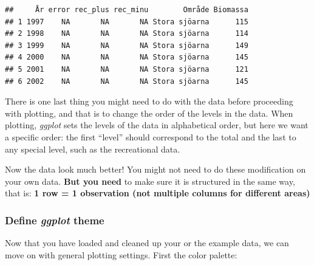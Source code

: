 \documentclass[]{article}
\newenvironment{Shaded}{\begin{snugshade}}{\end{snugshade}}
\newcommand{\KeywordTok}[1]{\textcolor[rgb]{0.13,0.29,0.53}{\textbf{#1}}}
\newcommand{\DataTypeTok}[1]{\textcolor[rgb]{0.13,0.29,0.53}{#1}}
\newcommand{\StringTok}[1]{\textcolor[rgb]{0.31,0.60,0.02}{#1}}
\newcommand{\OperatorTok}[1]{\textcolor[rgb]{0.81,0.36,0.00}{\textbf{#1}}}
\newcommand{\NormalTok}[1]{#1}
\begin{document}
\begin{verbatim}
##     År error rec_plus rec_minu        Område Biomassa
## 1 1997    NA       NA       NA Stora sjöarna      115
## 2 1998    NA       NA       NA Stora sjöarna      114
## 3 1999    NA       NA       NA Stora sjöarna      149
## 4 2000    NA       NA       NA Stora sjöarna      145
## 5 2001    NA       NA       NA Stora sjöarna      121
## 6 2002    NA       NA       NA Stora sjöarna      145
\end{verbatim}

There is one last thing you might need to do with the data before
proceeding with plotting, and that is to change the order of the levels
in the data. When plotting, \emph{ggplot} sets the levels of the data in
alphabetical order, but here we want a specific order: the first
``level'' should correspond to the total and the last to any special
level, such as the recreational data.

\begin{Shaded}
\end{Shaded}

Now the data look much better! You might not need to do these
modification on your own data. \textbf{But you need} to make sure it is
structured in the same way, that is: \textbf{1 row = 1 observation (not
multiple columns for different areas)}

\subsubsection{\texorpdfstring{Define \emph{ggplot}
theme}{Define ggplot theme}}\label{define-ggplot-theme}

Now that you have loaded and cleaned up your or the example data, we can
move on with general plotting settings. First the color palette:
\end{document}

